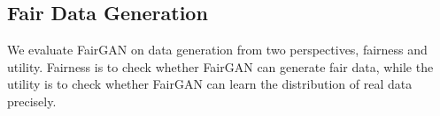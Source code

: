 \documentclass[sigconf]{acmart}
\theoremstyle{definition}
\begin{document}


\subsection{Fair Data Generation}

We evaluate FairGAN on data generation from two perspectives, fairness and utility. Fairness is to check whether FairGAN can generate fair data, while the utility is to check whether FairGAN can learn the distribution of real data precisely.

\begin{table}[h]
	\centering
	\caption{Risk differences of real and synthetic datasets}
	\label{tbl:cjpd}
\end{table}
\end{document}
